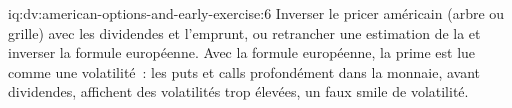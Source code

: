 \begin{solution}{iq:dv:american-options-and-early-exercise:6}
Inverser le pricer américain (arbre ou grille) avec les dividendes et l'emprunt, ou retrancher une
estimation de la  et inverser la formule européenne. Avec la
formule européenne, la prime est lue comme une volatilité~: les puts et calls profondément dans la
monnaie, avant dividendes, affichent des volatilités trop élevées, un faux smile de volatilité.
\end{solution}
